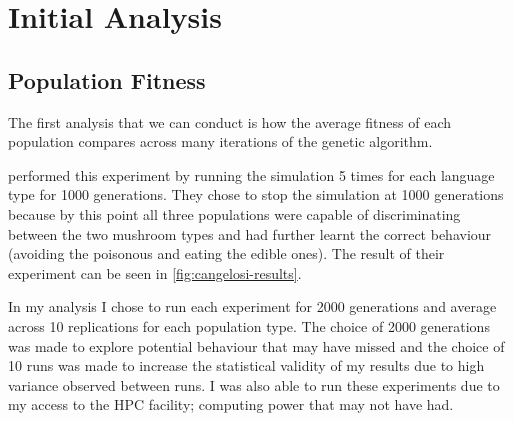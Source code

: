 \documentclass[12pt,a4paper]{report}
\begin{document}
\section{Initial Analysis}

\subsection{Population Fitness}\label{section:popfit}
 
The first analysis that we can conduct is how the average fitness of each population compares across many iterations of the genetic algorithm.

\citet{Cangelosi1998} performed this experiment by running the simulation 5 times for each language type for 1000 generations. They chose to stop the simulation at 1000 generations because by this point all three populations were capable of discriminating between the two mushroom types and had further learnt the correct behaviour (avoiding the poisonous and eating the edible ones). The result of their experiment can be seen in \cref{fig:cangelosi-results}.

In my analysis I chose to run each experiment for 2000 generations and average across 10 replications for each population type. The choice of 2000 generations was made to explore potential behaviour that \citet{Cangelosi1998} may have missed and the choice of 10 runs was made to increase the statistical validity of my results due to high variance observed between runs. I was also able to run these experiments due to my access to the HPC facility; computing power that \citet{Cangelosi1998} may not have had. 
\end{document}
